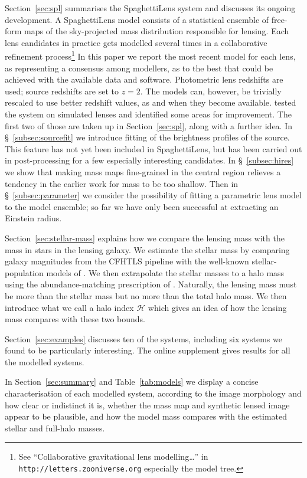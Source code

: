 \documentclass[fleqn,usenatbib]{mnras}
\newcommand{\haloindex}{\mathcal{H}}
\begin{document}
Section~\ref{sec:spl} summarises the SpaghettiLens system and
discusses its ongoing development. A SpaghettiLens model consists of a
statistical ensemble of free-form maps of the sky-projected mass
distribution responsible for lensing.  Each lens candidates in
practice gets modelled several times in a collaborative refinement
process\footnote{See ``Collaborative gravitational lens
  modelling\dots'' in {\tt http://letters.zooniverse.org} especially
  the model tree.}  In this paper we report the most recent model for
each lens, as representing a consensus among modellers, as to the best
that could be achieved with the available data and software.
Photometric lens redshifts are used; source redshifts are set to
$z=2$.  The models can, however, be trivially rescaled to use better
redshift values, as and when they become available.
\cite{2015MNRAS.447.2170K} tested the system on simulated lenses and
identified some areas for improvement.  The first two of those are
taken up in Section~\ref{sec:spl}, along with a further idea. In
\S~\ref{subsec:sourcefit} we introduce fitting of the brightness
profiles of the source.  This feature has not yet been included in
SpaghettiLens, but has been carried out in post-processing for a few
especially interesting candidates.  In \S~\ref{subsec:hires} we show
that making mass maps fine-grained in the central region relieves a
tendency in the earlier work for mass to be too shallow. Then in
\S~\ref{subsec:parameter} we consider the possibility of fitting a
parametric lens model to the model ensemble; so far we have only been
successful at extracting an Einstein radius.

Section~\ref{sec:stellar-mass} explains how we compare the lensing
mass with the mass in stars in the lensing galaxy.  We estimate the
stellar mass by comparing galaxy magnitudes from the CFHTLS pipeline
with the well-known stellar-population models of
\cite{2003MNRAS.344.1000B}.  We then extrapolate the stellar masses to
a halo mass using the abundance-matching prescription of
\cite{2010ApJ...710..903M}.  Naturally, the lensing mass must be more
than the stellar mass but no more than the total halo mass.  We then
introduce what we call a halo index $\haloindex$ which gives an idea
of how the lensing mass compares with these two bounds.

Section~\ref{sec:examples} discusses ten of the systems, including six
systems we found to be particularly interesting.  The online
supplement gives results for all the modelled systems.

In Section~\ref{sec:summary} and Table~\ref{tab:models} we display a
concise characterisation of each modelled system, according to the
image morphology and how clear or indistinct it is, whether the mass
map and synthetic lensed image appear to be plausible, and how the
model mass compares with the estimated stellar and full-halo masses.
\end{document}
